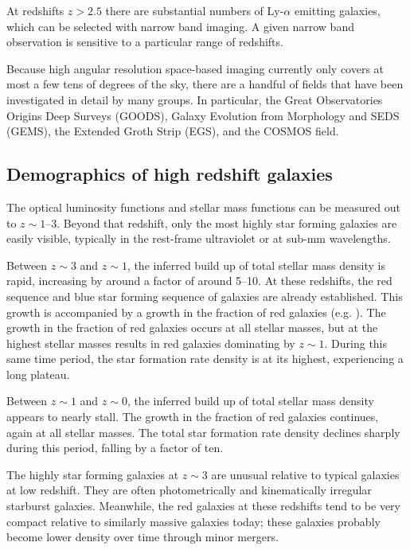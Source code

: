 At redshifts $z>2.5$ there are substantial numbers of Ly-$\alpha$
emitting galaxies, which can be selected with narrow band imaging. A
given narrow band observation is sensitive to a particular range of
redshifts. 

Because high angular resolution space-based imaging currently only
covers at most a few tens of degrees of the sky, there are a handful
of fields that have been investigated in detail by many groups. In
particular, the Great Observatories Origins Deep Surveys (GOODS),
Galaxy Evolution from Morphology and SEDS (GEMS), the Extended Groth
Strip (EGS), and the COSMOS field.

\subsection{Demographics of high redshift galaxies}

The optical luminosity functions and stellar mass functions can be
measured out to $z\sim 1$--3. Beyond that redshift, only the most
highly star forming galaxies are easily visible, typically in the
rest-frame ultraviolet or at sub-mm wavelengths.

Between $z\sim 3$ and $z\sim 1$, the inferred build up of total
stellar mass density is rapid, increasing by around a factor of around
5--10. At these redshifts, the red sequence and blue star forming
sequence of galaxies are already established. This growth is
accompanied by a growth in the fraction of red galaxies
(e.g. \citealt{mortlock14a}). The growth in the fraction of red
galaxies occurs at all stellar masses, but at the highest stellar
masses results in red galaxies dominating by $z\sim 1$. During this
same time period, the star formation rate density is at its highest,
experiencing a long plateau.

Between $z\sim 1$ and $z\sim 0$, the inferred build up of total
stellar mass density appears to nearly stall. The growth in the
fraction of red galaxies continues, again at all stellar masses. The
total star formation rate density declines sharply during this period,
falling by a factor of ten.

The highly star forming galaxies at $z\sim 3$ are unusual relative to
typical galaxies at low redshift. They are often photometrically and
kinematically irregular starburst galaxies. Meanwhile, the red
galaxies at these redshifts tend to be very compact relative to
similarly massive galaxies today; these galaxies probably become lower
density over time through minor mergers.

